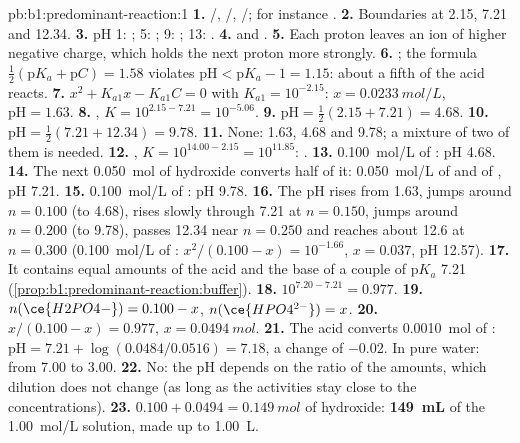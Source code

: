 \begin{solution}{pb:b1:predominant-reaction:1}
\textbf{1.} /, /,
/; for instance .
\textbf{2.} Boundaries at 2.15, 7.21 and 12.34.
\textbf{3.} pH 1: ; 5: ; 9: ; 13:
.
\textbf{4.}  and .
\textbf{5.} Each proton leaves an ion of higher negative charge, which
holds the next proton more strongly.
\textbf{6.} ; the formula
$\frac12(\mathrm{p}K_a + \mathrm{p}C) = 1.58$ violates $\mathrm{pH} <
\mathrm{p}K_a - 1 = 1.15$: about a fifth of the acid reacts.
\textbf{7.} $x^2 + K_{a1}x - K_{a1}C = 0$ with $K_{a1} = 10^{-2.15}$: $x =
\qty{0.0233}{mol/L}$, $\mathrm{pH} = 1.63$.
\textbf{8.} , $K = 10^{2.15 - 7.21} =
10^{-5.06}$.
\textbf{9.} $\mathrm{pH} = \frac12(2.15 + 7.21) = 4.68$.
\textbf{10.} $\mathrm{pH} = \frac12(7.21 + 12.34) = 9.78$.
\textbf{11.} None: 1.63, 4.68 and 9.78; a mixture of two of them is
needed.
\textbf{12.} , $K = 10^{14.00 - 2.15} =
10^{11.85}$: .
\textbf{13.} \qty{0.100}{mol/L} of : pH 4.68.
\textbf{14.} The next \qty{0.050}{mol} of hydroxide converts half of it:
\qty{0.050}{mol/L} of  and of , pH 7.21.
\textbf{15.} \qty{0.100}{mol/L} of : pH 9.78.
\textbf{16.} The pH rises from 1.63, jumps around $n = 0.100$ (to 4.68),
rises slowly through 7.21 at $n = 0.150$, jumps around $n = 0.200$ (to
9.78), passes 12.34 near $n = 0.250$ and reaches about 12.6 at $n = 0.300$ (\qty{0.100}{mol/L} of : $x^2/(0.100 - x) = 10^{-1.66}$, $x = 0.037$, pH 12.57).
\textbf{17.} It contains equal amounts of the acid and the base of a couple
of $\mathrm{p}K_a$ 7.21 (\cref{prop:b1:predominant-reaction:buffer}).
\textbf{18.} $10^{7.20 - 7.21} = 0.977$.
\textbf{19.} $n(\ce{H2PO4-}) = 0.100 - x$, $n(\ce{HPO4^{2-}}) = x$.
\textbf{20.} $x/(0.100 - x) = 0.977$, $x = \qty{0.0494}{mol}$.
\textbf{21.} The acid converts \qty{0.0010}{mol} of :
$\mathrm{pH} = 7.21 + \log(0.0484/0.0516) = 7.18$, a change of $-0.02$. In
pure water: from 7.00 to 3.00.
\textbf{22.} No: the pH depends on the ratio of the amounts, which dilution
does not change (as long as the activities stay close to the
concentrations).
\textbf{23.} $0.100 + 0.0494 = \qty{0.149}{mol}$ of hydroxide: \textbf{\qty{149}{mL}}
of the \qty{1.00}{mol/L} solution, made up to \qty{1.00}{L}.
\end{solution}
